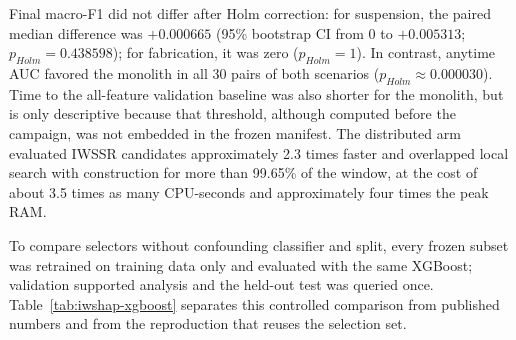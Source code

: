 \begin{landscape}
\begin{table}[p]
\centering
\scriptsize
\caption{X-CANIDS architectural replication: medians of 30 seeds per architecture and scenario.}
\label{tab:iwshap-architecture}
\end{table}
\end{landscape}

Final macro-F1 did not differ after Holm correction: for suspension, the paired median difference was $+0.000665$ (95\% bootstrap CI from 0 to $+0.005313$; $p_{Holm}=0.438598$); for fabrication, it was zero ($p_{Holm}=1$). In contrast, anytime AUC favored the monolith in all 30 pairs of both scenarios ($p_{Holm}\approx0.000030$). Time to the all-feature validation baseline was also shorter for the monolith, but is only descriptive because that threshold, although computed before the campaign, was not embedded in the frozen manifest. The distributed arm evaluated IWSSR candidates approximately 2.3 times faster and overlapped local search with construction for more than 99.65\% of the window, at the cost of about 3.5 times as many CPU-seconds and approximately four times the peak RAM.

To compare selectors without confounding classifier and split, every frozen subset was retrained on training data only and evaluated with the same XGBoost; validation supported analysis and the held-out test was queried once. Table~\ref{tab:iwshap-xgboost} separates this controlled comparison from published numbers and from the reproduction that reuses the selection set.

